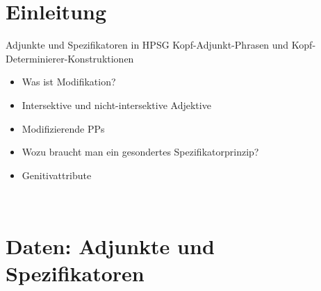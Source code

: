 \section{Einleitung}

\begin{frame}
  {Adjunkte und Spezifikatoren in HPSG}
  \onslide<+->
  \onslide<+->
  Kopf-Adjunkt-Phrasen und Kopf-Determinierer-Konstruktionen\\
  \Zeile
  \begin{itemize}[<+->]
    \item Was ist Modifikation?
    \item Intersektive und nicht-intersektive Adjektive
    \item Modifizierende PPs
    \item Wozu braucht man ein gesondertes Spezifikatorprinzip?
    \item Genitivattribute
  \end{itemize}
  \Zeile
  \onslide<+->
  \centering 
  \\
\end{frame}

\section{Daten: Adjunkte und Spezifikatoren}

